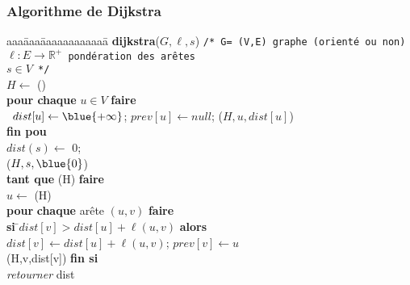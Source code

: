    \begin{frame}
     \frametitle{Algorithme de Dijkstra}
     \subtitle{Calcul de plus courtes chaînes}
     \begin{tabbing}
       aaa\=aaa\=aaaaaaaaaaaa\=\kill
       \textbf{dijkstra}($G,\ell,s$) \texttt{/* G= (V,E) graphe (orienté ou non)} \\
       \>\>\> \texttt{$\ell:E \rightarrow \mathbb{R}^{+}$ pondération des arêtes} \\
       \>\>\> \texttt{$s\in V$ */} \\
       \> $H \leftarrow$ () \\
       \> \textbf{pour chaque} $u \in V$ \textbf{faire} \\
       \> \ $dist[u] \leftarrow \blue{\mathbf{+\infty}}$; $prev[u]\leftarrow null$; ($H,u,dist[u]$)    \\ \> \textbf{fin pou} \\
        \>  $dist(s) \leftarrow$ 0;\\
       \> ($H,s,\blue{0}$) \\
       \> \textbf{tant que} (H) \textbf{faire} \\
       \> \> $u \leftarrow$ (H) \\
       \> \> \textbf{pour}\= \textbf{ chaque} arête $(u,v)$ \textbf{faire} \\
       \> \> \> \textbf{si} \=$dist[v] > dist[u]+ \ell(u, v)$ \textbf{alors} \\
       \> \> \> \> $dist[v] \leftarrow dist[u]+ \ell(u, v)$; $ prev[v] \leftarrow u$ \\
       \> \> \> \> (H,v,dist[v])  \textbf{fin si}\\
       \> \textsl{retourner} dist
     \end{tabbing}
   \end{frame}


